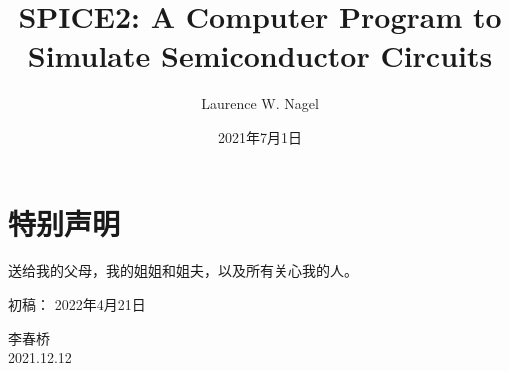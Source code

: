 \documentclass[cn,11pt,chinese]{elegantbook}
\title{SPICE2: A Computer Program to Simulate Semiconductor Circuits}
\author{Laurence W. Nagel}
\date{2021年7月1日}
\begin{document}
\maketitle
\frontmatter

\chapter*{特别声明}

送给我的父母，我的姐姐和姐夫，以及所有关心我的人。

初稿： 2022年4月21日

\vskip 1.5cm

\begin{flushright}
李春桥\\
2021.12.12
\end{flushright}



\tableofcontents

\mainmatter











\appendix






\nocite{*}

\end{document}
